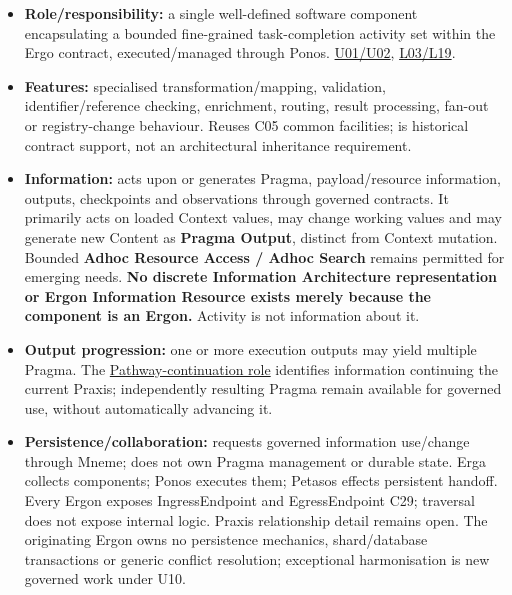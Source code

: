 \begin{itemize}


\item \textbf{Role/responsibility:} a single well-defined software component encapsulating
  a bounded fine-grained task-completion activity set within the Ergo contract,
  executed/managed through Ponos. \href{\detokenize{../../../../../docs/markdown/05-information-systems-architecture/sources.md#u02}}{U01/U02}, \href{\detokenize{../../../../../docs/markdown/05-information-systems-architecture/sources.md#l03}}{L03/L19}.

\item \textbf{Features:} specialised transformation/mapping, validation, identifier/reference
  checking, enrichment, routing, result processing, fan-out or registry-change
  behaviour. Reuses C05 common facilities; \texttt{} is historical contract
  support, not an architectural inheritance requirement.

\item \textbf{Information:} acts upon or generates Pragma, payload/resource information,
  outputs, checkpoints and observations through governed contracts. It primarily
  acts on loaded Context values, may change working values and may generate new
  Content as \textbf{Pragma Output}, distinct from Context mutation. Bounded \textbf{Adhoc
  Resource Access / Adhoc Search} remains permitted for emerging needs. \textbf{No discrete
  Information Architecture representation or Ergon Information Resource exists
  merely because the component is an Ergon.} Activity is not information about it.

\item \textbf{Output progression:} one or more execution outputs may yield multiple Pragma.
  The \hyperref[element:27ad143e7c784e378556af8a57c438f7]{Pathway-continuation role}
  identifies information continuing the current Praxis; independently resulting
  Pragma remain available for governed use, without automatically advancing it.

\item \textbf{Persistence/collaboration:} requests governed information use/change through
  Mneme; does not own Pragma management or durable state. Erga collects components;
  Ponos executes them; Petasos effects persistent handoff. Every Ergon exposes
  IngressEndpoint and EgressEndpoint C29; traversal does not expose internal logic.
  Praxis relationship detail remains open. The originating Ergon owns no persistence
  mechanics, shard/database transactions or generic conflict resolution; exceptional
  harmonisation is new governed work under U10.


\end{itemize}
